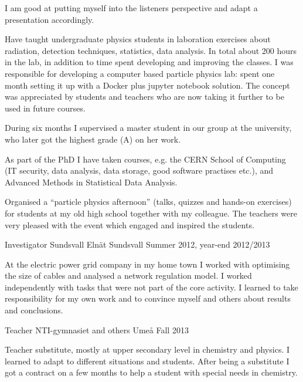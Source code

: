 \begin{cventries}
{\begin{cvitems}
{	I am good at putting myself into the listeners perspective and adapt a presentation accordingly.
}
\item {Have taught undergraduate physics students in laboration exercises about radiation, detection techniques, statistics, data analysis. 
       In total about 200 hours in the lab, in addition to time spent developing and improving the classes.
       I was responsible for developing a computer based particle physics lab: spent one month setting it up with a Docker plus jupyter notebook solution.
       The concept was appreciated by students and teachers who are now taking it further to be used in future courses.
}
\item {During six months I supervised a master student in our group at the university, who later got the highest grade (A) on her work.
}
\item {As part of the PhD I have taken courses, e.g. the CERN School of Computing (IT security, data analysis, data storage, good software practises etc.), and Advanced Methods in Statistical Data Analysis.
}
\item {Organised a ``particle physics afternoon'' (talks, quizzes and hands-on exercises) for students at my old high school together with my colleague.
         The teachers were very pleased with the event which engaged and inspired the students.
}
\end{cvitems}
}



\cventry
{Investigator} %
{Sundsvall Eln\"{a}t} %
{Sundsvall} %
{Summer 2012, year-end 2012/2013} %
{ %
\begin{cvitems}
\item {At the electric power grid company in my home town I worked with optimising the size of cables and analysed a network regulation model. 
		 I worked independently with tasks that were not part of the core activity. 
		 I learned to take responsibility for my own work and to convince myself and others about results and conclusions. 
}
\end{cvitems}
}


\cventry
{Teacher} %
{NTI-gymnasiet and others} %
{Ume{\aa}} %
{Fall 2013} %
{ %
\begin{cvitems}
\item {Teacher substitute, mostly at upper secondary level in chemistry and physics. 
		I learned to adapt to different situations and students. 
		After being a substitute I got a contract on a few months to help a student with special needs in chemistry.
		 }
\end{cvitems}
}


\end{cventries}
